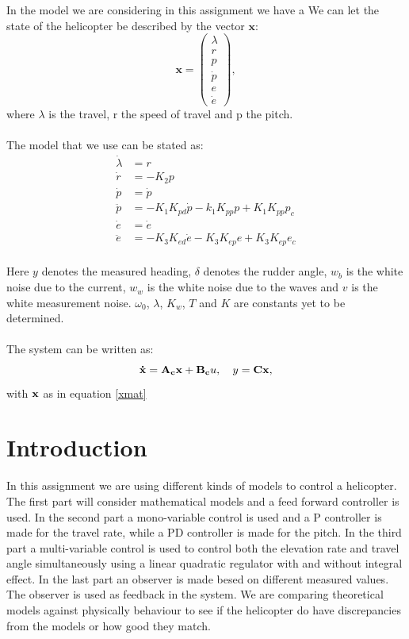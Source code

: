 \documentclass[12pt, a4paper]{article}%
\begin{document}
In the model we are considering in this assignment we have a We can let the state of the helicopter be described by the vector $\mathbf{x}$: 
\begin{equation}
\mathbf{x} =
\begin{pmatrix}
\lambda \\
r \\
p \\
\dot{p} \\
e \\
\dot{e}
\end{pmatrix},
\label{xmat}
\end{equation}
where $\lambda$ is the travel, r the speed of travel and p the pitch.
\\
\\
The model that we use can be stated as:
\begin{subequations}
\begin{alignat}{6}
\dot{\lambda} &= r \\
\dot{r} &= -K_2p \\
\dot{p} &= \dot{p} \\
\ddot{p} &= -K_1K_{pd}\dot{p} - k_1K_{pp}p + K_1K_{pp}p_c \\
\dot{e} &= \dot{e} \\
\ddot{e} &= -K_3K_{ed}\dot{e} - K_3K_{ep}e + K_3K_{ep}e_c
\end{alignat}
\label{model}
\end{subequations}
\\
Here $y$ denotes the measured heading, $\delta$ denotes the rudder angle, $w_b$ is the white noise due to the current, $w_w$ is the white noise due to the waves and $v$ is the white measurement noise. $\omega_0$, $\lambda$, $K_w$, $T$ and $K$ are constants yet to be determined. 
\\
\\
The system can be written as:
\begin{equation}
\bold{\dot{x} = A_cx + B_c}u,\quad y = \bold{Cx},
\label{system}
\end{equation}
with $\bold{x}$ as in equation \eqref{xmat}



\newpage

\section{Introduction}
\label{S:1}
In this assignment we are using different kinds of models to control a helicopter. The first part will consider mathematical models and a feed forward controller is used. In the second part a mono-variable control is used and a P controller is made for the travel rate, while a PD controller is made for the pitch. In the third part a multi-variable control is used to control both the elevation rate and travel angle simultaneously using a linear quadratic regulator with and without integral effect. In the last part an observer is made besed on different measured values. The observer is used as feedback in the system. We are comparing theoretical models against physically behaviour to see if the helicopter do have discrepancies from the models or how good they match. 
\end{document}
